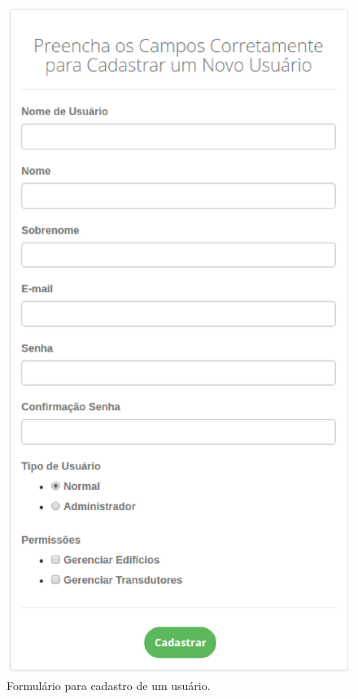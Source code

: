 \begin{anexosenv}
\begin{figure}[!htpb]
    \centering
    \includegraphics[keepaspectratio=true,scale=0.8]{figuras/img3.eps}
    \caption{Formulário para cadastro de um usuário.}
    \label{img3}
\end{figure}


\end{anexosenv}
